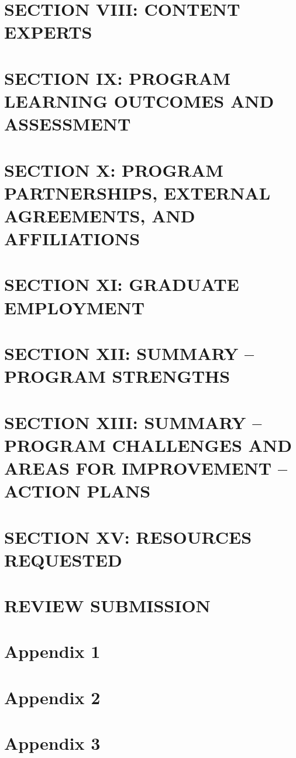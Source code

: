 \documentclass[12pt,a4paper,man,natbib,donotrepeattitle, book]{apa6}
\begin{document}
\section{SECTION VIII: CONTENT EXPERTS}
%

\section{SECTION IX: PROGRAM LEARNING OUTCOMES AND ASSESSMENT}
%

\section{SECTION X: PROGRAM PARTNERSHIPS, EXTERNAL AGREEMENTS, AND AFFILIATIONS}
%

\section{SECTION XI: GRADUATE EMPLOYMENT}
%

\section{SECTION XII: SUMMARY – PROGRAM STRENGTHS}
%

\section{SECTION XIII: SUMMARY – PROGRAM CHALLENGES AND AREAS FOR IMPROVEMENT – ACTION PLANS}
%

\section{SECTION XV: RESOURCES REQUESTED}
%

\section{REVIEW SUBMISSION}
%

\section{Appendix 1}
%

\section{Appendix 2}
%

\section{Appendix 3}
%
\end{document}
